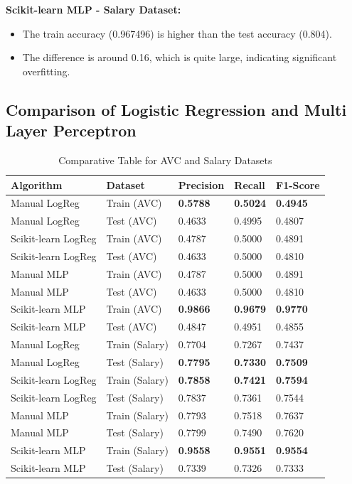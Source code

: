 \documentclass[a4paper,12pt]{article}
\begin{document}
\textbf{Scikit-learn MLP - Salary Dataset:}
\begin{itemize}
    \item The train accuracy (0.967496) is higher than the test accuracy (0.804).
    \item The difference is around 0.16, which is quite large, indicating significant overfitting.
\end{itemize}


\subsection{Comparison of Logistic Regression and Multi Layer Perceptron}

\begin{table}[h!]
    \centering
    \caption{Comparative Table for AVC and Salary Datasets}
    \begin{tabularx}{\textwidth}{|l|l|X|X|X|}
    \hline
    \textbf{Algorithm} & \textbf{Dataset} & \textbf{Precision} & \textbf{Recall} & \textbf{F1-Score} \\
    \hline
    Manual LogReg & Train (AVC) & \textbf{0.5788} & \textbf{0.5024} & \textbf{0.4945} \\
    Manual LogReg & Test (AVC) & 0.4633 & 0.4995 & 0.4807 \\
    Scikit-learn LogReg & Train (AVC) & 0.4787 & 0.5000 & 0.4891 \\
    Scikit-learn LogReg & Test (AVC) & 0.4633 & 0.5000 & 0.4810 \\
    Manual MLP & Train (AVC) & 0.4787 & 0.5000 & 0.4891 \\
    Manual MLP & Test (AVC) & 0.4633 & 0.5000 & 0.4810 \\
    Scikit-learn MLP & Train (AVC) & \textbf{0.9866} & \textbf{0.9679} & \textbf{0.9770} \\
    Scikit-learn MLP & Test (AVC) & 0.4847 & 0.4951 & 0.4855 \\
    \hline
    Manual LogReg & Train (Salary) & 0.7704 & 0.7267 & 0.7437 \\
    Manual LogReg & Test (Salary) & \textbf{0.7795} & \textbf{0.7330} & \textbf{0.7509} \\
    Scikit-learn LogReg & Train (Salary) & \textbf{0.7858} & \textbf{0.7421} & \textbf{0.7594} \\
    Scikit-learn LogReg & Test (Salary) & 0.7837 & 0.7361 & 0.7544 \\
    Manual MLP & Train (Salary) & 0.7793 & 0.7518 & 0.7637 \\
    Manual MLP & Test (Salary) & 0.7799 & 0.7490 & 0.7620 \\
    Scikit-learn MLP & Train (Salary) & \textbf{0.9558} & \textbf{0.9551} & \textbf{0.9554} \\
    Scikit-learn MLP & Test (Salary) & 0.7339 & 0.7326 & 0.7333 \\
    \hline
    \end{tabularx}
\end{table}
\end{document}
